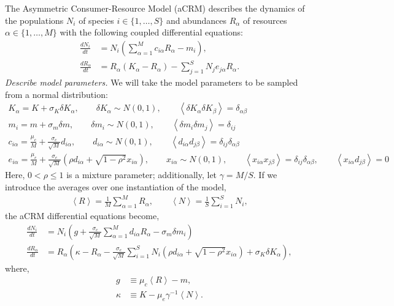 \documentclass[10pt]{article}
\newcommand{\eval}[1]{\left\langle #1 \right\rangle}
\begin{document}
The Asymmetric Consumer-Resource Model (aCRM) describes the dynamics of the populations $N_i$ of species $i \in \{1,\dots,S\}$ and abundances $R_\alpha$ of resources $\alpha \in \{1,\dots, M\}$ with the following coupled differential equations:
\begin{align}
	\frac{dN_i}{dt}
	&=
	N_i \left(
		\sum_{\alpha=1}^M c_{i\alpha}R_\alpha - m_i
	\right),
	\\
	\frac{dR_\alpha}{dt}
	&=
	R_\alpha \left(K_\alpha - R_\alpha\right)
	-
	\sum_{j=1}^S N_j e_{j\alpha}R_\alpha.
\end{align}
{\em Describe model parameters.}
We will take the model parameters to be sampled from a normal distribution:
\begin{gather}
	K_\alpha = K + \sigma_K \delta K_\alpha,
	\qquad
	\delta K_\alpha \sim N(0,1),
	\qquad
	\eval{\delta K_\alpha \delta K_\beta} = \delta_{\alpha\beta}
	\\
	m_i = m + \sigma_m \delta m,
	\qquad
	\delta m_i \sim N(0,1),
	\qquad
	\eval{\delta m_i \delta m_j} = \delta_{ij}
	\\
	c_{i\alpha} = \frac{\mu_c}{M} + \frac{\sigma_c}{\sqrt{M}}d_{i\alpha},
	\qquad
	d_{i\alpha} \sim N(0,1),
	\qquad
	\eval{d_{i\alpha}d_{j\beta}} = \delta_{ij}\delta_{\alpha\beta}\\
	e_{i\alpha}
	=
	\frac{\mu_e}{M}
	+
	\frac{\sigma_e}{\sqrt{M}}
	\left(
		\rho d_{i\alpha} + \sqrt{1-\rho^2} x_{i\alpha}
	\right),
	\qquad
	x_{i\alpha}\sim N(0,1),
	\qquad
	\eval{x_{i\alpha}x_{j\beta}} 
	=
	\delta_{ij}\delta_{\alpha\beta},
	\qquad
	\eval{x_{i\alpha}d_{j\beta}} 
	=
	0
\end{gather}
Here, $0<\rho\leq 1$ is a mixture parameter; additionally, let $\gamma = M/S$.
If we introduce the averages over one instantiation of the model,
\begin{align}
	\eval{R}
	=
	\frac{1}{M}\sum_{\alpha=1}^M R_\alpha,
	\qquad
	\eval{N}
	=
	\frac{1}{S}\sum_{i=1}^S N_i,
\end{align}
the aCRM differential equations become,
\begin{align}
	\frac{dN_i}{dt}
	&=
	N_i
	\left(
	g
	+
	\frac{\sigma_c}{\sqrt{M}}
	\sum_{\alpha=1}^M 
	d_{i\alpha}
	R_\alpha
	-
	\sigma_m
	\delta m_i
	\right)
	\\
	\frac{dR_\alpha}{dt}
	&=
	R_\alpha
	\left(
		\kappa
		-
		R_\alpha
		-
		\frac{\sigma_e}{\sqrt{M}}
		\sum_{i=1}^{S}
		N_i
		\left(
			\rho d_{i\alpha} + \sqrt{1-\rho^2} x_{i\alpha}
		\right)
		+ 
		\sigma_K \delta K_\alpha
	\right),
\end{align}
where,
\begin{align}
	g 
	&\equiv
	\mu_c \eval{R}
	-
	m,
	\\
	\kappa
	&\equiv
	K 
	-
	\mu_e \gamma^{-1} \eval{N}.
\end{align}
\end{document}
